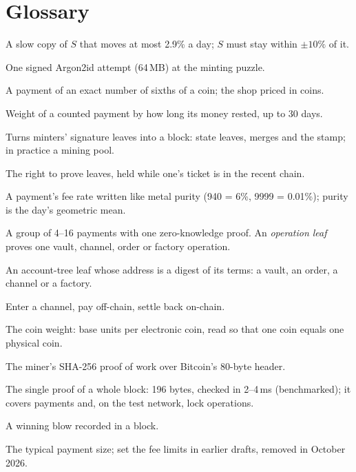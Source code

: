 \section{Glossary}
\begin{description}[leftmargin=3.1cm,labelwidth=2.9cm,labelindent=0pt,itemsep=1pt]
\item[Anchor] A slow copy of $S$ that moves at most 2.9\% a day; $S$ must stay within $\pm10\%$ of it.
\item[Blow] One signed Argon2id attempt (64\,MB) at the minting puzzle.
\item[Coin-priced] A payment of an exact number of sixths of a coin; the shop priced in coins.
\item[Coin-days] Weight of a counted payment by how long its money rested, up to 30 days.
\item[Builder] Turns minters' signature leaves into a block: state leaves, merges and the stamp; in practice a mining pool.
\item[Credential] The right to prove leaves, held while one's ticket is in the recent chain.
\item[Fineness / purity] A payment's fee rate written like metal purity (940 = 6\%, 9999 = 0.01\%); purity is the day's geometric mean.
\item[Leaf] A group of 4--16 payments with one zero-knowledge proof. An \emph{operation leaf} proves one vault, channel, order or factory operation.
\item[Lock] An account-tree leaf whose address is a digest of its terms: a vault, an order, a channel or a factory.
\item[Melt, stream, cast] Enter a channel, pay off-chain, settle back on-chain.
\item[$S$] The coin weight: base units per electronic coin, read so that one coin equals one physical coin.
\item[Seal] The miner's SHA-256 proof of work over Bitcoin's 80-byte header.
\item[Stamp] The single proof of a whole block: 196 bytes, checked in 2--4\,ms (benchmarked); it covers payments and, on the test network, lock operations.
\item[Ticket] A winning blow recorded in a block.
\item[$W$] The typical payment size; set the fee limits in earlier drafts, removed in October 2026.
\end{description}
